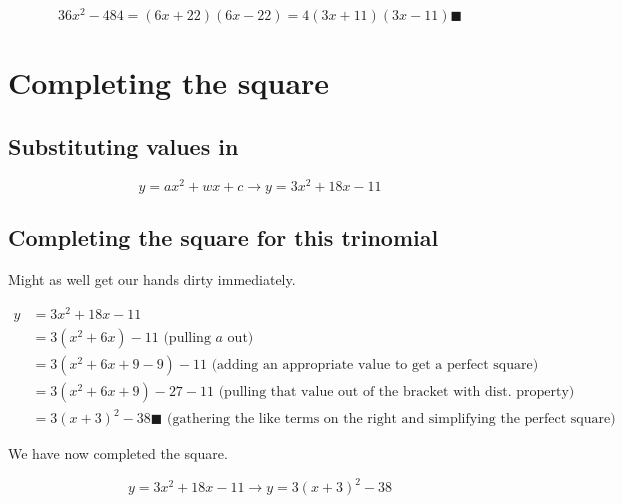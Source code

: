\documentclass[12pt]{article}
\begin{document}
\[
36x^2 - 484 = (6x + 22)(6x - 22) = 4(3x + 11)(3x - 11)\blacksquare
\]

\newpage

\section{Completing the square}

\subsection{Substituting values in}

\[
y = ax^2 + wx + c \longrightarrow y = 3x^2 + 18x - 11
\]

\subsection{Completing the square for this trinomial}

Might as well get our hands dirty immediately.

\begin{align*} 
y &= 3x^2 + 18x - 11 \\
  &= 3(x^2 + 6x) - 11 \text{ (pulling $a$ out)}\\
  &= 3(x^2 + 6x + 9 - 9) - 11 \text{ (adding an appropriate value to get a perfect square)}\\
  &= 3(x^2 + 6x + 9) - 27 - 11 \text{ (pulling that value out of the bracket with dist. property)}\\
  &= 3(x + 3)^2 - 38\blacksquare \text{ (gathering the like terms on the right and simplifying the perfect square)}
\end{align*}

We have now completed the square.

\[
y = 3x^2 + 18x - 11 \longrightarrow \boxed{y = 3(x + 3)^2 - 38}
\]
\end{document}
